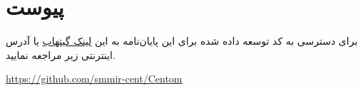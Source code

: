 \chapter*{‌پیوست}

برای دسترسی به کد توسعه داده شده برای این پایان‌نامه به این 
\href{https://github.com/smmir-cent/Centom}{لینک گیتهاب} 
یا آدرس اینترنتی زیر مراجعه نمایید.


\url{https://github.com/smmir-cent/Centom}

